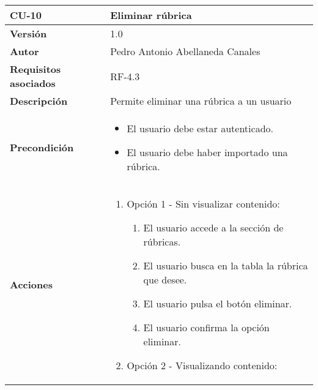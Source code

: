 \begin{table}[p]
	\centering
	\begin{tabularx}{\linewidth}{ p{} p{} }
		\toprule
		\textbf{CU-10}    & \textbf{Eliminar rúbrica} \\
		\midrule
		\textbf{Versión}              & 1.0    \\
		\textbf{Autor}                & Pedro Antonio Abellaneda Canales \\
		\textbf{Requisitos asociados} & RF-4.3 \\
		\textbf{Descripción}          & Permite eliminar una rúbrica a un usuario \\
		\textbf{Precondición}         & \begin{itemize}
                                        \tightlist
		                                  \item El usuario debe estar autenticado.
		                                  \item El usuario debe haber importado una rúbrica.
		                                 \end{itemize} \\
		\textbf{Acciones}             &
                                    \begin{enumerate}
                                        \tightlist
                                        \item Opción 1 - Sin visualizar contenido:
                            		\begin{enumerate}
                            			\def\labelenumi{\arabic{enumi}.}
                            			\tightlist
                            			\item El usuario accede a la sección de rúbricas.
                                        \item El usuario busca en la tabla la rúbrica que desee.
                            			\item El usuario pulsa el botón eliminar.
                                        \item El usuario confirma la opción eliminar.
                            		\end{enumerate}
                                        \item Opción 2 - Visualizando contenido:
                            		\begin{enumerate}
                            			\def\labelenumi{\arabic{enumi}.}
                            			\tightlist

\end{enumerate}
\end{enumerate}
\end{tabularx}
\end{table}
